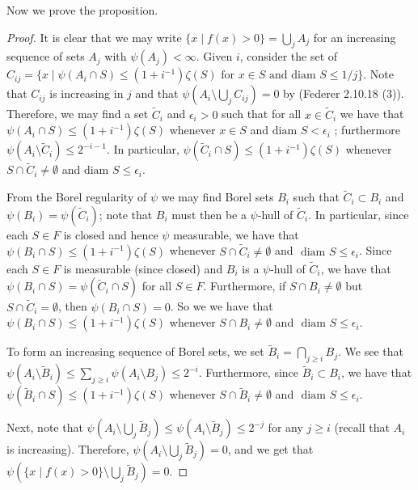 Now we prove the proposition.
\begin{proof}
It is clear that we may write \(\{x \mid f(x) > 0\} = \bigcup_j A_j\) for an increasing sequence of sets
\(A_j\) with \(\psi(A_j) < \infty\). Given \(i\),  consider the set of
\(C_{ij} = \{x \mid \psi(A_i \cap S) \leq (1 + i^{-1}) \zeta(S) \text{ for } x \in S
    \text{ and diam } S \leq 1/j\}\). Note that \(C_{ij}\) is increasing in \(j\) and that 
\(\psi\left( A_i \setminus \bigcup_{j} C_{ij} \right) = 0\) by (Federer 2.10.18 (3)). Therefore, we may
find a set \(\tilde C_i\) and \(\epsilon_i > 0\) such that for all \(x \in \tilde C_i\) we have that
\(\psi(A_i \cap S) \leq (1 + i^{-1}) \zeta(S)\)
whenever \(x \in S\) and \(\text{diam } S < \epsilon_i\)
; furthermore \(\psi(A_i \setminus \tilde C_i) \leq 2^{-i - 1}\). In particular,
\(\psi(\tilde C_i \cap S) \leq (1 + i^{-1}) \zeta(S)\) whenever \(S \cap \tilde C_i \neq \emptyset\) and
\(\text{diam } S \leq \epsilon_i\).

From the Borel regularity of \(\psi\) we may find Borel sets \(B_i\) such that \(\tilde C_i \subset B_i\) and
\(\psi(B_i) = \psi(\tilde C_i)\); note that \(B_i\) must then be a \(\psi\)-hull of \(\tilde C_i\).
In particular, since
each \(S \in F\) is closed and hence \(\psi\) measurable, we have that 
\(\psi(B_i \cap S) \leq (1 + i^{-1}) \zeta(S)\) whenever \(S \cap \tilde C_i \neq \emptyset\) and
\(\text{ diam } S \leq \epsilon_i\). Since each \(S \in F\) is measurable (since closed) and
\(B_i\) is a \(\psi\)-hull of \(\tilde C_i\), we have that \(\psi(B_i \cap S) = \psi(\tilde C_i \cap S)\) for all
\(S \in F\). Furthermore, if \(S \cap B_i \neq \emptyset\) but
\(S \cap \tilde C_i = \emptyset\), then \(\psi(B_i \cap S) = 0\). So we we have
that \(\psi(B_i \cap S) \leq (1 + i^{-1}) \zeta(S)\) whenever \(S \cap B_i \neq \emptyset\) and
\(\text{ diam } S \leq \epsilon_i\).

To form an increasing sequence of Borel sets, we set \(\tilde B_i = \bigcap_{j \geq i} B_j\). We see that
\(\psi(A_i \setminus \tilde B_i) \leq \sum_{j \geq i} \psi(A_i \setminus B_j) \leq 2^{-i}\). Furthermore,
since \(\tilde B_i \subset B_i\), we have that \(\psi(\tilde B_i \cap S) \leq (1 + i^{-1}) \zeta(S)\) whenever
\(S \cap \tilde B_i \neq \emptyset\) and
\(\text{ diam } S \leq \epsilon_i\).

Next, note that \(\psi\left(A_i \setminus \bigcup_j \tilde B_j\right) \leq \psi(A_i \setminus \tilde B_j) \leq
2^{-j}\)
for any \(j \geq i\) (recall that \(A_i\) is increasing). Therefore,
\(\psi\left(A_i \setminus \bigcup_j \tilde B_j\right) = 0\), and we get that
\(\psi\left( \{ x \mid f(x) > 0 \} \setminus \bigcup_j \tilde B_j \right) = 0\).
\end{proof}
